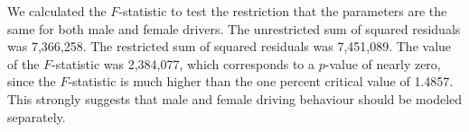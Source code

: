 We calculated the $F$-statistic to test the restriction 
that the parameters are the same for both male and female drivers. 
The unrestricted sum of squared residuals was 7,366,258. 
The restricted sum of squared residuals was 7,451,089. 
The value of the $F$-statistic was 2,384,077, 
which corresponds to a $p$-value of nearly zero, since the $F$-statistic is much higher than 
 the one percent critical value of 1.4857. 
This strongly suggests that male and female driving behaviour should be modeled separately. 
